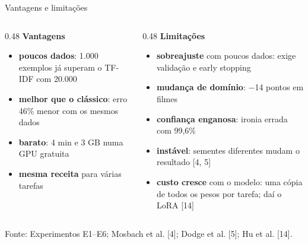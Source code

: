\documentclass[aspectratio=169,10pt]{beamer}
\newcommand{\fonte}[1]{\par\vfill{\scriptsize\color{tinta2}Fonte: #1}}
\begin{document}
\begin{frame}{Vantagens e limitações}
  \begin{columns}[T]
    \begin{column}{0.48\textwidth}
      \textbf{\color{azul}Vantagens}
      \begin{itemize}
        \item \textbf{poucos dados}: 1.000 exemplos já superam o TF-IDF com 20.000
        \item \textbf{melhor que o clássico}: erro 46\% menor com os mesmos dados
        \item \textbf{barato}: 4 min e 3 GB numa GPU gratuita
        \item \textbf{mesma receita} para várias tarefas
      \end{itemize}
    \end{column}
    \begin{column}{0.48\textwidth}
      \textbf{\color{laranja}Limitações}
      \begin{itemize}
        \item \textbf{sobreajuste} com poucos dados: exige validação e early stopping
        \item \textbf{mudança de domínio}: $-$14 pontos em filmes
        \item \textbf{confiança enganosa}: ironia errada com 99,6\%
        \item \textbf{instável}: sementes diferentes mudam o resultado [4, 5]
        \item \textbf{custo cresce} com o modelo: uma cópia de todos os pesos por tarefa; daí o LoRA [14]
      \end{itemize}
    \end{column}
  \end{columns}
  \fonte{Experimentos E1--E6; Mosbach et al. [4]; Dodge et al. [5]; Hu et al. [14].}
\end{frame}

\end{document}
